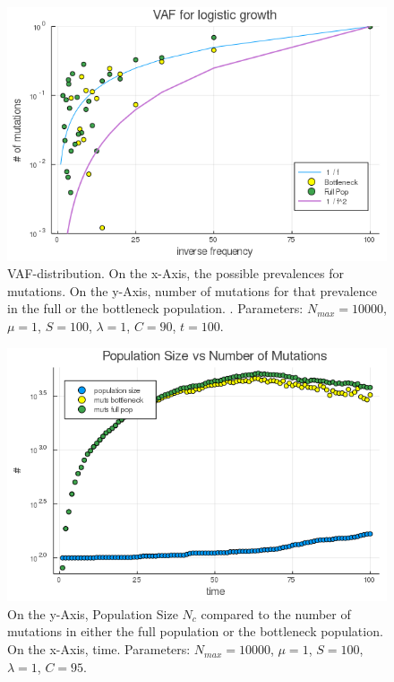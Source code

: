 \documentclass{article}
\numberwithin{equation}{subsection}
\begin{document}
	\begin{figure}[h!]
		\centering
		\includegraphics[width=\linewidth]{Figures/LogGrowth/document/stable_soma/LogVarTimesC_N10000_mu1_t100_d32_C90}
		
		
		\caption{VAF-distribution. On the x-Axis, the possible prevalences for mutations. On the y-Axis, number of mutations for that prevalence in the full or the bottleneck population. . Parameters: $ N_{max} = 10000$, $\mu = 1 $, $ S = 100 $, $ \lambda = 1$, $C = 90 $,  $ t = 100 $.}
		\label{fig::VAFC}
	\end{figure}

	\begin{figure}[h!]
	\centering
	\includegraphics[width=\linewidth]{Figures/LogGrowth/document/stable_soma/LogVarTimesMutLive_N10000_mu1_t100_d32_C95}
	
	\caption{On the y-Axis, Population Size $N_c$ compared to the number of mutations in either the full population or the bottleneck population. On the x-Axis, time. Parameters: $ N_{max} = 10000$, $\mu = 1 $, $ S = 100 $, $ \lambda = 1$, $ C = 95 $.}
	\label{fig::NMutstimeC2}
\end{figure}
\end{document}
